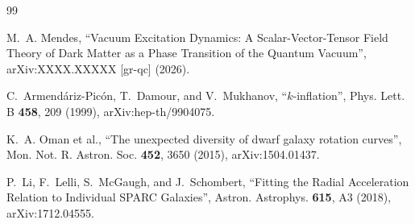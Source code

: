 \documentclass[aps,prd,reprint,floatfix,nofootinbib,superscriptaddress]{revtex4-2}
\begin{document}
\begin{thebibliography}{99}

M.~A. Mendes, ``Vacuum Excitation Dynamics: A Scalar-Vector-Tensor
Field Theory of Dark Matter as a Phase Transition of the Quantum
Vacuum'', arXiv:XXXX.XXXXX [gr-qc] (2026).

C.~Armend\'ariz-Pic\'on, T.~Damour, and V.~Mukhanov,
``$k$-inflation'',
Phys. Lett. B \textbf{458}, 209 (1999), arXiv:hep-th/9904075.

K.~A. Oman et al.,
``The unexpected diversity of dwarf galaxy rotation curves'',
Mon. Not. R. Astron. Soc. \textbf{452}, 3650 (2015),
arXiv:1504.01437.

P.~Li, F.~Lelli, S.~McGaugh, and J.~Schombert,
``Fitting the Radial Acceleration Relation to Individual SPARC
Galaxies'',
Astron. Astrophys. \textbf{615}, A3 (2018), arXiv:1712.04555.

\end{thebibliography}
\end{document}
